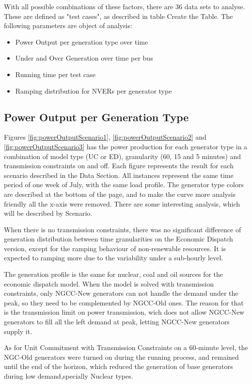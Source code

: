 \documentclass[12pt,LUDisStyle,twosided]{book}
\begin{document}
With all possible combinations of these factors, there are 36 data sets to analyse. These are defined as "test cases", as described in table Create the Table. The following parameters are object of analysis:

\begin{itemize}
\item Power Output per generation type over time
\item Under and Over Generation over time per bus
\item Running time per test case
\item Ramping distribution for NVERs per generator type
\end{itemize}

\subsection{Power Output per Generation Type}

Figures \ref{fig:powerOutputScenario1}, \ref{fig:powerOutputScenario2} and \ref{fig:powerOutputScenario3} has the power production for each generator type in a combination of model type (UC or ED), granularity (60, 15 and 5 minutes) and transmission constraints on and off. Each figure represents the result for each scenario described in the Data Section. All instances represent the same time period of one week of July, with the same load profile. The generator type colors are described at the bottom of the page, and to make the curve more analysis friendly all the x-axis were removed. There are some interesting analysis, which will be described by Scenario.


When there is no transmission constraints, there was no significant difference of generation distribution between time granularities on the Economic Dispatch version, except for the ramping behaviour of non-renewable resources. It is expected to ramping more due to the variability under a sub-hourly level. 

The generation profile is the same for nuclear, coal and oil sources for the economic dispatch model. When the model is solved with transmission constraints, only NGCC-New generators can not handle the demand under the peak, so they need to be complemented by NGCC-Old ones. The reason for that is the transmission limit on power transmission, wich does not allow NGCC-New generators to fill all the left demand at peak, letting NGCC-New generators supply it.

As for Unit Commitment with Transmission Constraints on a 60-minute level, the NGC-Old generators were turned on during the running process, and remained until the end of the horizon, which reduced the generation of base generators during low demand,specially Nuclear types.
\end{document}
